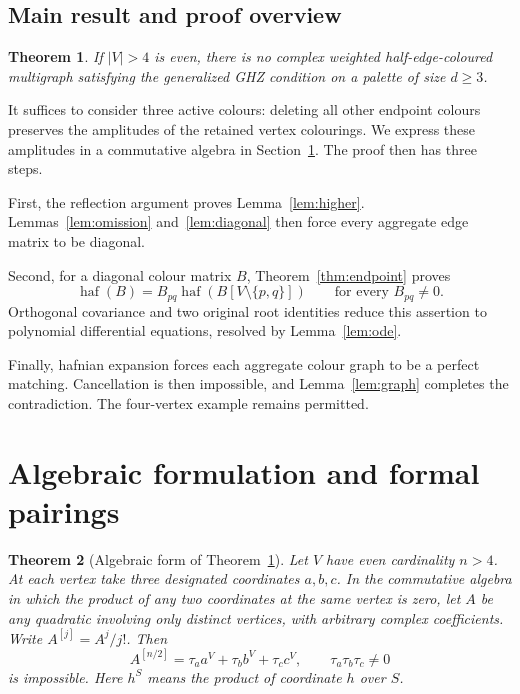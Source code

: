 \documentclass[11pt]{article}
\newtheorem{theorem}{Theorem}[section]
\theoremstyle{definition}
\theoremstyle{plain}
\numberwithin{equation}{section}
\begin{document}
\subsection{Main result and proof overview}

\begin{theorem}\label{thm:graphmain}
If \(|V|>4\) is even, there is no complex weighted half-edge-coloured
multigraph satisfying the generalized GHZ condition on a palette of size
\(d\ge3\).
\end{theorem}

It suffices to consider three active colours: deleting all other endpoint
colours preserves the amplitudes of the retained vertex colourings. We express
these amplitudes in a commutative algebra in Section~\ref{sec:model}.
The proof then has three steps.

First, the reflection argument proves Lemma~\ref{lem:higher}.
Lemmas~\ref{lem:omission}
and~\ref{lem:diagonal} then force every aggregate edge matrix to be diagonal.

Second, for a diagonal colour matrix \(B\), Theorem~\ref{thm:endpoint} proves
\[
 \operatorname{haf}(B)=B_{pq}\operatorname{haf}(B[V\setminus\{p,q\}])
 \qquad\text{for every }B_{pq}\ne0.
\]
Orthogonal covariance and two original root identities reduce this assertion
to polynomial differential equations, resolved by Lemma~\ref{lem:ode}.

Finally, hafnian expansion forces each aggregate colour graph to be a perfect
matching. Cancellation is then impossible, and Lemma~\ref{lem:graph} completes
the contradiction. The four-vertex example remains permitted.

\section{Algebraic formulation and formal pairings}\label{sec:model}

\begin{theorem}[Algebraic form of Theorem~\ref{thm:graphmain}]\label{thm:main}
Let \(V\) have even cardinality \(n>4\). At each vertex take three designated
coordinates \(a,b,c\). In the commutative algebra in which the product of any
two coordinates at the same vertex is zero, let \(A\) be any quadratic involving
only distinct vertices, with arbitrary complex coefficients. Write
\(A^{[j]}=A^j/j!\). Then
\begin{equation}
 A^{[n/2]}=\tau_a a^V+\tau_b b^V+\tau_c c^V,
 \qquad \tau_a\tau_b\tau_c\ne0
 \tag{1}\label{eq:target}
\end{equation}
is impossible. Here \(h^S\) means the product of coordinate \(h\) over \(S\).
\end{theorem}
\end{document}
